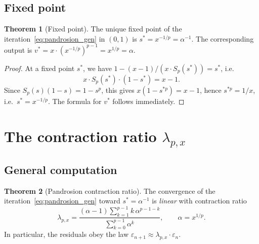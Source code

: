 \documentclass[11pt,a4paper]{article}
\theoremstyle{definition}
\newtheorem{theorem}{Theorem}[section]
\newcommand{\eps}{\varepsilon}
\begin{document}
\subsection{Fixed point}

\begin{theorem}[Fixed point]
\label{thm:fixed_point}
The unique fixed point of the iteration~\eqref{eq:pandrosion_gen} in $(0,1)$ is $s^* = x^{-1/p} = \alpha^{-1}$. The corresponding output is $v^* = x \cdot (x^{-1/p})^{p-1} = x^{1/p} = \alpha$.
\end{theorem}

\begin{proof}
At a fixed point $s^*$, we have $1 - (x-1)/(x \cdot S_p(s^*)) = s^*$, i.e.\
\[
  x \cdot S_p(s^*) \cdot (1 - s^*) = x - 1.
\]
Since $S_p(s)(1-s) = 1 - s^p$, this gives $x(1 - s^{*p}) = x - 1$, hence $s^{*p} = 1/x$, i.e.\ $s^* = x^{-1/p}$. The formula for $v^*$ follows immediately.
\end{proof}

\section{The contraction ratio \texorpdfstring{$\lambda_{p,x}$}{lambda}}
\label{sec:coefficient}

\subsection{General computation}

\begin{theorem}[Pandrosion contraction ratio]
\label{thm:lambda}
The convergence of the iteration~\eqref{eq:pandrosion_gen} toward $s^* = \alpha^{-1}$ is \emph{linear} with contraction ratio
\begin{equation}
  \label{eq:lambda_general}
  \boxed{
  \lambda_{p,x} = \frac{(\alpha - 1)\displaystyle\sum_{k=1}^{p-1} k\,\alpha^{p-1-k}}{\displaystyle\sum_{k=0}^{p-1} \alpha^k}
  }, \qquad \alpha = x^{1/p}.
\end{equation}
In particular, the residuals obey the law $\eps_{n+1} \approx \lambda_{p,x} \cdot \eps_n$.
\end{theorem}
\end{document}

